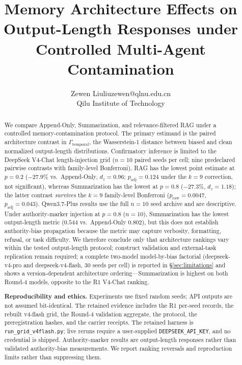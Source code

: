 \documentclass[11pt]{article}
\title{Memory Architecture Effects on Output-Length Responses under Controlled Multi-Agent Contamination}
\author{\name Zewen Liu\email liuzewen@qlnu.edu.cn\\\addr Qilu Institute of Technology}  %
\date{}
\begin{document}
\maketitle

\begin{abstract}
We compare Append-Only, Summarization, and relevance-filtered RAG under a controlled memory-contamination protocol. The primary estimand is the paired architecture contrast in $\Gamma_{\text{temporal}}$, the Wasserstein-1 distance between biased and clean normalized output-length distributions. Confirmatory inference is limited to the DeepSeek V4-Chat length-injection grid ($n{=}10$ paired seeds per cell; nine predeclared pairwise contrasts with family-level Bonferroni). RAG has the lowest point estimate at $p{=}0.2$ ($-27.9\%$ vs.\ Append-Only, $d_z{=}0.96$; $p_{\text{adj}}{=}0.124$ under the $k{=}9$ correction, not significant), whereas Summarization has the lowest at $p{=}0.8$ ($-27.3\%$, $d_z{=}1.18$); the latter contrast \emph{survives} the $k{=}9$ family-level Bonferroni ($p_{\text{raw}}{=}0.0047$, $p_{\text{adj}}{=}0.043$). Qwen3.7-Plus results use the full $n{=}10$ seed archive and are descriptive. Under authority-marker injection at $p{=}0.8$ ($n{=}10$), Summarization has the lowest output-length metric ($0.544$ vs.\ Append-Only $0.802$), but this does not establish authority-bias propagation because the metric may capture verbosity, formatting, refusal, or task difficulty. We therefore conclude only that architecture rankings vary within the tested output-length protocol; construct validation and external-task replication remain required; a complete two-model model-by-bias factorial (deepseek-v4-pro and deepseek-v4-flash, 30 seeds per cell) is reported in \S\ref{sec:limitations} and shows a version-dependent architecture ordering---Summarization is highest on both Round-4 models, opposite to the R1 V4-Chat ranking.


\textbf{Reproducibility and ethics.} Experiments use fixed random seeds; API outputs are not assumed bit-identical. The retained evidence includes the R1 per-seed records, the rebuilt v4-flash grid, the Round-4 validation aggregate, the protocol, the preregistration hashes, and the carrier receipts. The retained harness is \texttt{run\_grid\_v4flash.py}; live reruns require a user-supplied \texttt{DEEPSEEK\_API\_KEY}, and no credential is shipped. Authority-marker results are output-length responses rather than validated authority-bias measurements. We report ranking reversals and reproduction limits rather than suppressing them.\end{abstract}
\end{document}
